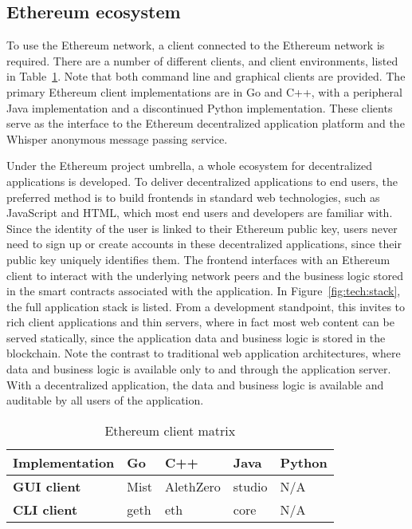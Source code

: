 \subsection{Ethereum ecosystem}
To use the Ethereum network, a client connected to the Ethereum network is required. There are a number of different clients, and client environments, listed in Table~\ref{eth-clients}. Note that both command line and graphical clients are provided. The primary Ethereum client implementations are in Go and C++, with a peripheral Java implementation and a discontinued Python implementation. These clients serve as the interface to the Ethereum decentralized application platform and the Whisper anonymous message passing service.

Under the Ethereum project umbrella, a whole ecosystem for decentralized applications is developed. To deliver decentralized applications to end users, the preferred method is to build frontends in standard web technologies, such as JavaScript and HTML, which most end users and developers are familiar with. Since the identity of the user is linked to their Ethereum public key, users never need to sign up or create accounts in these decentralized applications, since their public key uniquely identifies them. The frontend interfaces with an Ethereum client to interact with the underlying network peers and the business logic stored in the smart contracts associated with the application. In Figure~\ref{fig:tech:stack}, the full application stack is listed.
From a development standpoint, this invites to rich client applications and thin servers, where in fact most web content can be served statically, since the application data and business logic is stored in the blockchain. Note the contrast to traditional web application architectures, where data and business logic is available only to and through the application server. With a decentralized application, the data and business logic is available and auditable by all users of the application.


\begin{table}[ht]
\centering
\caption{Ethereum client matrix}
\label{eth-clients}
\begin{tabular}{|l|l|l|l|l|}
\hline \textbf{Implementation} & Go & C++ & Java & Python \\ \hline
\textbf{GUI client} & Mist & AlethZero & studio & N/A \\ \hline 
\textbf{CLI client} & geth & eth & core & N/A \\ \hline
\end{tabular}
\end{table}

